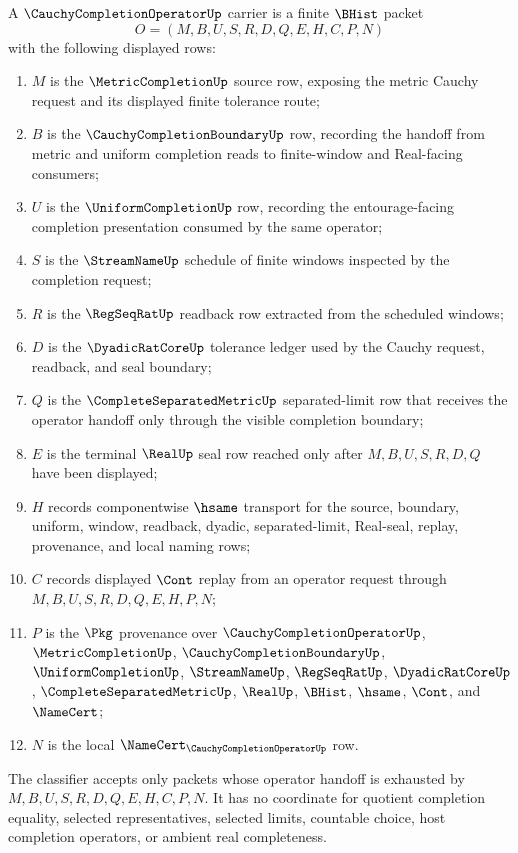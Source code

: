 \begin{definition}
\label{def:cauchy-completion-operator-carrier}
A $\CauchyCompletionOperatorUp$ carrier is a finite $\BHist$ packet
$$
O=(M,B,U,S,R,D,Q,E,H,C,P,N)
$$
with the following displayed rows:
\begin{enumerate}
\item $M$ is the $\MetricCompletionUp$ source row, exposing the metric Cauchy request and its displayed finite tolerance route;
\item $B$ is the $\CauchyCompletionBoundaryUp$ row, recording the handoff from metric and uniform completion reads to finite-window and Real-facing consumers;
\item $U$ is the $\UniformCompletionUp$ row, recording the entourage-facing completion presentation consumed by the same operator;
\item $S$ is the $\StreamNameUp$ schedule of finite windows inspected by the completion request;
\item $R$ is the $\RegSeqRatUp$ readback row extracted from the scheduled windows;
\item $D$ is the $\DyadicRatCoreUp$ tolerance ledger used by the Cauchy request, readback, and seal boundary;
\item $Q$ is the $\CompleteSeparatedMetricUp$ separated-limit row that receives the operator handoff only through the visible completion boundary;
\item $E$ is the terminal $\RealUp$ seal row reached only after $M,B,U,S,R,D,Q$ have been displayed;
\item $H$ records componentwise $\hsame$ transport for the source, boundary, uniform, window, readback, dyadic, separated-limit, Real-seal, replay, provenance, and local naming rows;
\item $C$ records displayed $\Cont$ replay from an operator request through $M,B,U,S,R,D,Q,E,H,P,N$;
\item $P$ is the $\Pkg$ provenance over $\CauchyCompletionOperatorUp$, $\MetricCompletionUp$, $\CauchyCompletionBoundaryUp$, $\UniformCompletionUp$, $\StreamNameUp$, $\RegSeqRatUp$, $\DyadicRatCoreUp$, $\CompleteSeparatedMetricUp$, $\RealUp$, $\BHist$, $\hsame$, $\Cont$, and $\NameCert$;
\item $N$ is the local $\NameCert_{\CauchyCompletionOperatorUp}$ row.
\end{enumerate}
The classifier accepts only packets whose operator handoff is exhausted by $M,B,U,S,R,D,Q,E,H,C,P,N$. It has no coordinate for quotient completion equality, selected representatives, selected limits, countable choice, host completion operators, or ambient real completeness.
\end{definition}

